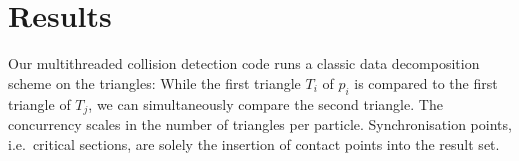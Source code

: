 \section{Results}
\label{section:intra-particle}

Our multithreaded collision detection code runs a classic data decomposition
scheme on the triangles:
While the first triangle $T_i$ of $p_i$ is compared to the first triangle of $T_j$, we can simultaneously compare the second triangle. 
The concurrency scales in the number of triangles per particle.
Synchronisation points, i.e.~critical sections, are solely the insertion of
contact points into the result set.
